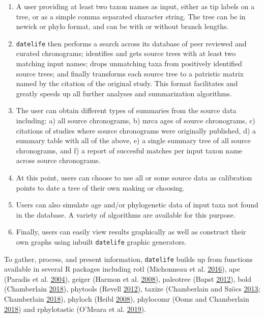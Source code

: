 \documentclass[]{article}
\providecommand{\tightlist}{%
  \setlength{\itemsep}{0pt}\setlength{\parskip}{0pt}}
\begin{document}
\begin{enumerate}
\def\labelenumi{\arabic{enumi})}
\tightlist
\item
  A user providing at least two taxon names as input, either as tip labels on a tree, or as a simple comma separated character string. The tree can be in newick or phylo format, and can be with or without branch lengths.
\item
  \texttt{datelife} then performs a search across its database of peer reviewed and curated chronograms; identifies and gets source trees with at least two matching input names; drops unmatching taxa from positively identified source trees; and finally transforms each source tree to a patristic matrix named by the citation of the original study. This format facilitates and greatly speeds up all further analyses and summarization algorithms.
\item
  The user can obtain different types of summaries from the source data including: a) all source chronograms, b) mrca ages of source chronograms, c) citations of studies where source chronograms were originally published, d) a summary table with all of the above, e) a single summary tree of all source chronograms, and f) a report of succesful matches per input taxon name across source chronograms.
\item
  At this point, users can choose to use all or some source data as calibration points to date a tree of their own making or choosing. 
\item
  Users can also simulate age and/or phylogenetic data of input taxa not found in the database. A variety of algorithms are available for this purpose.
\item
  Finally, users can easily view results graphically as well as construct their own graphs using inbuilt \texttt{datelife} graphic generators.
\end{enumerate}

To gather, process, and present information, \texttt{datelife} builds up from functions
available in several R packages including rotl (Michonneau et al. \protect\hyperlink{ref-Michonneau2016}{2016}), ape (Paradis et al. \protect\hyperlink{ref-Paradis2004}{2004}),
geiger (Harmon et al. \protect\hyperlink{ref-Harmon2008}{2008}), paleotree (Bapst \protect\hyperlink{ref-Bapst2012a}{2012}), bold (Chamberlain \protect\hyperlink{ref-Chamberlain2018}{2018}), phytools (Revell \protect\hyperlink{ref-Revell2012}{2012}), taxize (Chamberlain and Szöcs \protect\hyperlink{ref-Chamberlain2013}{2013}; Chamberlain \protect\hyperlink{ref-Chamberlain2018}{2018}), phyloch (Heibl \protect\hyperlink{ref-Heibl2008}{2008}), phylocomr (Ooms and Chamberlain \protect\hyperlink{ref-Ooms2018}{2018}) and rphylotastic (O'Meara et al. \protect\hyperlink{ref-Omeara2019}{2019}).
\end{document}

